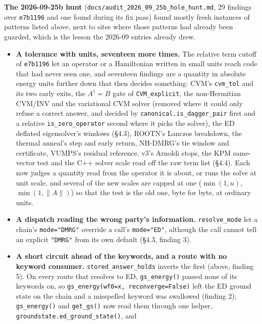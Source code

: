 \documentclass[11pt]{article}
\begin{document}
\textbf{The 2026-09-25b hunt}
(\texttt{docs/audit\_2026\_09\_25b\_hole\_hunt.md}, 29 findings over
\texttt{e7b1196} and one found during its fix pass) found mostly fresh
instances of patterns listed above, next to sites where those patterns had
already been guarded, which is the lesson the 2026-09 entries already
drew.

\begin{itemize}
  \item \textbf{A tolerance with units, seventeen more times.} The
    relative term cutoff of \texttt{e7b1196} let an operator or a
    Hamiltonian written in small units reach code that had never seen one,
    and seventeen findings are a quantity in absolute energy units further
    down that then decides something: CVM's \texttt{cvm\_tol} and its two
    early exits, the $A^\dagger=B$ gate of \texttt{CVM\_explicit}, the
    non-Hermitian CVM/INV and the variational CVM solver (removed where it
    could only refuse a correct answer, and decided by
    \texttt{canonical.is\_dagger\_pair} first and a relative
    \texttt{is\_zero\_operator} second where it picks the solver), the ED
    deflated eigensolver's windows (\S4.3), ROOTN's Lanczos breakdown, the
    thermal anneal's step and early return, NH-DMRG's tie window and
    certificate, VUMPS's residual reference, v3's Arnoldi stops, the KPM
    same-vector test and the C++ solver scale read off the raw term list
    (\S4.4). Each now judges a quantity read from the operator it is about,
    or runs the solve at unit scale, and several of the new scales are
    capped at one ($\min(1,u)$, $\min(1,\lVert A\rVert)$) so that the test
    is the old one, byte for byte, at ordinary units.
  \item \textbf{A dispatch reading the wrong party's information.}
    \texttt{resolve\_mode} let a chain's \texttt{mode="DMRG"} override a
    call's \texttt{mode="ED"}, although the call cannot tell an explicit
    \texttt{"DMRG"} from its own default (\S4.3, finding 3).
  \item \textbf{A short circuit ahead of the keywords, and a route with no
    keyword consumer.} \texttt{stored\_answer\_holds} inverts the first
    (above, finding 5). On every route that resolves to ED,
    \texttt{gs\_energy()} passed none of its keywords on, so
    \texttt{gs\_energy(wf0=x, reconverge=False)} left the ED ground state on
    the chain and a misspelled keyword was swallowed (finding 2);
    \texttt{gs\_energy()} and \texttt{get\_gs()} now read them through one
    helper, \texttt{groundstate.ed\_ground\_state()}, and

\end{itemize}
\end{document}
